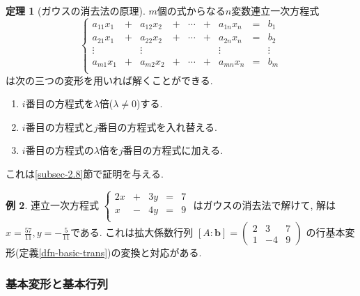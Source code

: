 \documentclass[dvipdfmx,a4paper,11pt]{article}
\theoremstyle{definition}
\newtheorem{thm}{定理}
\newtheorem{exa}[thm]{例}
\begin{document}
 \begin{tcolorbox}[
    colback = white,
    colframe = green!35!black,
    fonttitle = \bfseries,
    breakable = true]
    \begin{thm}[ガウスの消去法の原理]
 \label{thm-gauss}
$m$個の式からなる$n$変数連立一次方程式
\begin{equation*}
\left\{ 
\begin{matrix}
a_{11}x_1&+& a_{12} x_2& +&\cdots &+&a_{1n}x_n &= &b_1 \\
a_{21}x_1&+& a_{22} x_2& +&\cdots &+&a_{2n}x_n &= &b_2 \\
\vdots		&& 	\vdots				 && 		& &\vdots&&\vdots	\\
a_{m1}x_1&+& a_{m2} x_2& +&\cdots &+&a_{mn}x_n &= &b_m \\
\end{matrix}
\right.
\end{equation*}
は次の三つの変形を用いれば解くことができる.
 \begin{enumerate}
   \setlength{\parskip}{0cm} 
  \setlength{\itemsep}{0cm}
  \item $i$番目の方程式を$\lambda$倍($\lambda\neq 0$)する.
 \item $i$番目の方程式と$j$番目の方程式を入れ替える.
 \item $i$番目の方程式の$\lambda$倍を$j$番目の方程式に加える. 
 \end{enumerate}
  \end{thm}
 \end{tcolorbox}
これは\ref{subsec-2.8}節で証明を与える.
 
 
 \begin{exa}
 連立一次方程式
 $
 \left\{ 
\begin{matrix}
2x&+&3y& = &7 \\
x&-&4y& = &9 \\
\end{matrix}
\right.
 $
 はガウスの消去法で解けて, 解は$x = \frac{57}{11}, y=-\frac{5}{11}$である. 
これは拡大係数行列
 $[A : \bm{b}] = 
  \begin{pmatrix}
 2 & 3  &7\\
 1 & -4 &9
 \end{pmatrix}
 $
の行基本変形(定義\ref{dfn-basic-trans})の変換と対応がある. 
 \end{exa}


 \subsubsection{基本変形と基本行列}
 
\end{document}
